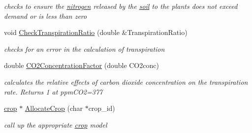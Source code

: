 \begin{DoxyCompactItemize}
\begin{DoxyCompactList}\small\item\em checks to ensure the \hyperlink{classnitrogen}{nitrogen} released by the \hyperlink{classsoil}{soil} to the plants does not exceed demand or is less than zero \item\end{DoxyCompactList}\item 
void \hyperlink{classecosystem_a6ae575e9cd3cadaca579108ea01be675}{CheckTranspirationRatio} (double \&TranspirationRatio)
\begin{DoxyCompactList}\small\item\em checks for an error in the calculation of transpiration \item\end{DoxyCompactList}\item 
double \hyperlink{classecosystem_a546f8786d6c5965b960fd3de1988863e}{CO2ConcentrationFactor} (double CO2conc)
\begin{DoxyCompactList}\small\item\em calculates the relative effects of carbon dioxide concentration on the transpiration rate. Returns 1 at ppmCO2=377 \item\end{DoxyCompactList}\item 
\hyperlink{classcrop}{crop} $\ast$ \hyperlink{classecosystem_a44c464a87c2f3e32ef0d874d53c2635b}{AllocateCrop} (char $\ast$crop\_\-id)
\begin{DoxyCompactList}\small\item\em call up the appropriate \hyperlink{classcrop}{crop} model \item\end{DoxyCompactList}\end{DoxyCompactItemize}
